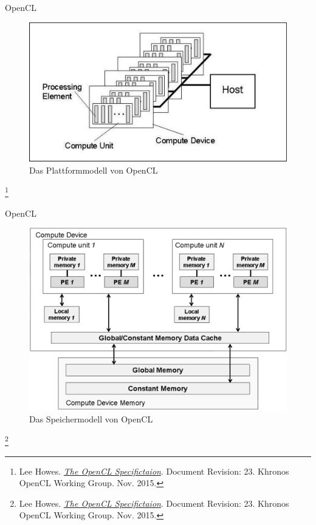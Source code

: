\documentclass[10pt]{beamer}
\let\svthefootnote\thefootnote
\begin{document}
\begin{frame}{OpenCL}
  \begin{figure}
    \centering
    \includegraphics[width=.9\linewidth]{figures/fg-opencl-platform-model.pdf}
    \caption{Das Plattformmodell von OpenCL}
  \end{figure}

  \footnotesize
  \let\thefootnote\relax\footnote{Lee Howes. \href{https://www.khronos.org/registry/OpenCL/specs/opencl-2.0.pdf}{\textit{The OpenCL Specifictaion}}. Document Revision: 23. Khronos OpenCL Working Group. Nov. 2015.}
  \addtocounter{footnote}{-1}\let\thefootnote\svthefootnote\relax
  \normalsize
\end{frame}

\begin{frame}{OpenCL}
  \begin{figure}
    \centering
    \includegraphics[width=.75\linewidth]{figures/fg-opencl-memory-model.pdf}
    \caption{Das Speichermodell von OpenCL}
  \end{figure}

  \footnotesize
  \let\thefootnote\relax\footnote{Lee Howes. \href{https://www.khronos.org/registry/OpenCL/specs/opencl-2.0.pdf}{\textit{The OpenCL Specifictaion}}. Document Revision: 23. Khronos OpenCL Working Group. Nov. 2015.}
  \addtocounter{footnote}{-1}\let\thefootnote\svthefootnote\relax
  \normalsize
\end{frame}
\end{document}
